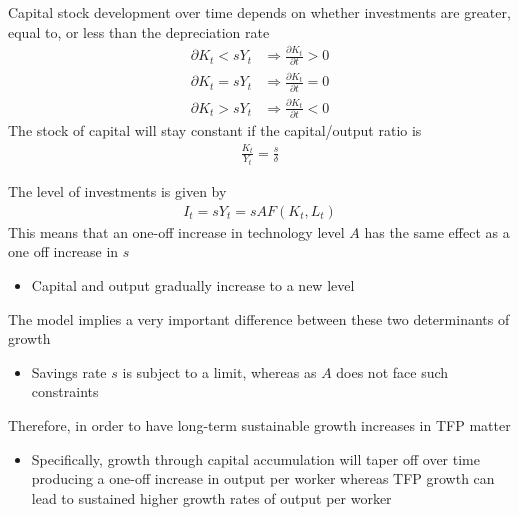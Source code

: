 \documentclass{beamer}
\begin{document}
\begin{frame}
    Capital stock development over time depends on whether investments are greater, equal to, or less than the depreciation rate
 \begin{align}
    \partial K_t < sY_t &\Rightarrow \frac{\partial K_t}{\partial t} > 0\\
    \partial K_t = sY_t &\Rightarrow \frac{\partial K_t}{\partial t} = 0\\
    \partial K_t > sY_t &\Rightarrow \frac{\partial K_t}{\partial t} < 0
 \end{align}
 \medskip
 The stock of capital will stay constant if the capital/output ratio is
  \begin{align}
    \frac{K_t}{Y_t} = \frac{s}{\delta}
  \end{align}
\end{frame}

\begin{frame}
  The level of investments is given by
\begin{align}
  I_t=sY_t=sAF(K_t,L_t)
\end{align}
 This means that an one-off increase in technology level $A$ has the same effect as a one off increase in $s$
 \begin{itemize}
   \item Capital and output gradually increase to a new level
 \end{itemize}
\end{frame}

\begin{frame}
  The model implies a very important difference between these two determinants of growth
  \begin{itemize}
    \item Savings rate $s$ is subject to a limit, whereas as $A$ does not face such constraints    
  \end{itemize}
  \medskip
  Therefore, in order to have long-term sustainable growth increases in TFP matter
  \begin{itemize}
    \item Specifically, growth through capital accumulation will taper off over time producing a one-off increase in output per worker whereas TFP growth can lead to sustained higher growth rates of output per worker 
  \end{itemize}  
\end{frame}
\end{document}
